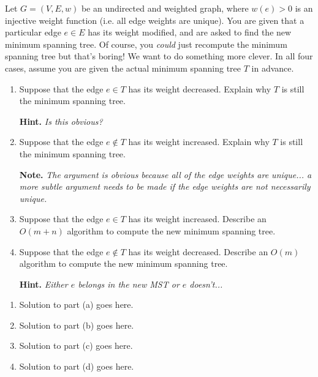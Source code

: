 \documentclass{article}
\begin{document}
\begin{question}
Let $G = (V, E, w)$ be an undirected and weighted graph, where $w(e) > 0$ is an injective weight function (i.e. all edge weights are unique). You are given that a particular edge $e \in E$ has its weight modified, and are asked to find the new minimum spanning tree. Of course, you {\em could} just recompute the minimum spanning tree but that's boring! We want to do something more clever. In all four cases, assume you are given the actual minimum spanning tree $T$ in advance.

\begin{enumerate}[label = (\alph*)]
    \item Suppose that the edge $e \in T$ has its weight decreased. Explain why $T$ is still the minimum spanning tree.

    {\bfseries Hint.} {\em Is this obvious?}

    \item Suppose that the edge $e \not\in T$ has its weight increased. Explain why $T$ is still the minimum spanning tree.

    {\bfseries Note.} {\em The argument is obvious because all of the edge weights are unique... a more subtle argument needs to be made if the edge weights are not necessarily unique.}

    \item Suppose that the edge $e \in T$ has its weight increased. Describe an $O(m + n)$ algorithm to compute the new minimum spanning tree.

    \item Suppose that the edge $e \not\in T$ has its weight decreased. Describe an $O(m)$ algorithm to compute the new minimum spanning tree.

    {\bfseries Hint.} {\em Either $e$ belongs in the new MST or $e$ doesn't...}
\end{enumerate}
\end{question}

\begin{solution}
\begin{enumerate}[label = (\alph*)]
    \item Solution to part (a) goes here.

    \item Solution to part (b) goes here.

    \item Solution to part (c) goes here.
    
    \item Solution to part (d) goes here.
\end{enumerate}
\end{solution}
\end{document}
